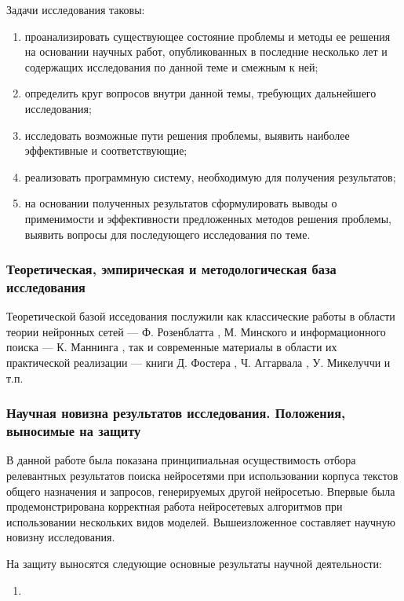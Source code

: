 Задачи исследования таковы:
\begin{enumerate}[1)]
    \item проанализировать существующее состояние проблемы и методы ее решения на основании научных работ, опубликованных
          в последние несколько лет и содержащих исследования по данной теме и смежным к ней;
    \item определить круг вопросов внутри данной темы, требующих дальнейшего исследования;
    \item исследовать возможные пути решения проблемы, выявить наиболее эффективные и соответствующие;
    \item реализовать программную систему, необходимую для получения результатов;
    \item на основании полученных результатов сформулировать выводы о применимости и эффективности предложенных
          методов решения проблемы, выявить вопросы для последующего исследования по теме.
\end{enumerate}

\subsubsection{Теоретическая, эмпирическая и методологическая база исследования}
Теоретической базой исседования послужили как классические работы в области теории нейронных сетей ---
Ф. Розенблатта \cite{rosenblatt1965}, М. Минского \cite{minsky1971} и информационного поиска --- 
К. Маннинга \cite{manning2011wwedenie}, так и современные материалы в области
их практической реализации --- книги Д. Фостера \cite{foster2020generative}, Ч. Аггарвала \cite{aggarwal2020neural},
У. Микелуччи \cite{michelucci2020} и т.п.
\subsubsection{Научная новизна результатов исследования. Положения, выносимые на защиту}
В данной работе была показана принципиальная осуществимость отбора релевантных результатов поиска нейросетями при использовании
корпуса текстов общего назначения и запросов, генерируемых другой нейросетью. Впервые была продемонстрирована корректная
работа нейросетевых алгоритмов при использовании нескольких видов моделей.
Вышеизложенное составляет научную новизну исследования.

На защиту выносятся следующие основные результаты научной деятельности:
\begin{enumerate}[1)]
    \item
\end{enumerate}

